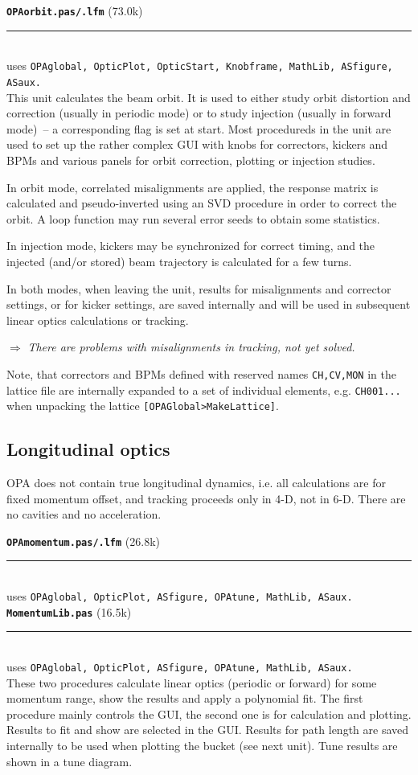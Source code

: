 \documentclass[12pt]{article}
\newcommand\todo[1]{$\Longrightarrow$ {\em #1} }
\newcommand\code[1]{{\tt [#1]}}
\newcommand\opamodule[3]{{\bf \tt #1} #2\\  \rule[3pt]{\textwidth}{0.2pt} \\ {\scriptsize uses \tt  #3}\\[1ex]}
\begin{document}
\opamodule{OPAorbit.pas/.lfm}{(73.0k)}{OPAglobal, OpticPlot,  OpticStart, Knobframe, MathLib, ASfigure, ASaux.}
This unit calculates the beam orbit. It is used to either study orbit distortion and correction (usually in periodic mode) or to study injection (usually in forward mode)~-- a corresponding flag is set at start. Most procedureds in the unit are used to set up the rather complex GUI with knobs for correctors, kickers and BPMs and various panels for orbit correction, plotting or injection studies.

In orbit mode, correlated misalignments are applied, the response matrix is calculated and pseudo-inverted using an SVD procedure in order to correct the orbit. A loop function may run several error seeds to obtain some statistics.

In injection mode, kickers may be synchronized for correct timing, and the injected (and/or stored) beam trajectory is calculated for a few turns.

In both modes, when leaving the unit, results for misalignments and corrector settings, or for kicker settings, are saved internally and will be used in subsequent linear optics calculations or tracking.

\todo{There are problems with misalignments in tracking, not yet solved.}

Note, that correctors and BPMs defined with reserved names {\tt CH,CV,MON} in the lattice file are internally expanded to a set of individual elements, e.g. {\tt CH001...} when unpacking the lattice \code{OPAGlobal>MakeLattice}.

\subsection{Longitudinal optics}
OPA does not contain true longitudinal dynamics, i.e. all calculations are for fixed momentum offset, and tracking proceeds only in 4-D, not in 6-D. There are no cavities and no acceleration.

\opamodule{OPAmomentum.pas/.lfm}{(26.8k)}{OPAglobal, OpticPlot, ASfigure, OPAtune, MathLib, ASaux.}
\opamodule{MomentumLib.pas}{(16.5k)}{OPAglobal, OpticPlot, ASfigure, OPAtune, MathLib, ASaux.}
These two procedures calculate linear optics (periodic or forward) for some momentum range, show the results and apply a polynomial fit. The first procedure mainly controls the GUI, the second one is for calculation and plotting.
Results to fit and show are selected in the GUI. Results for path length are saved internally to be used when plotting the bucket (see next unit). Tune results are shown in a tune diagram.
\end{document}
